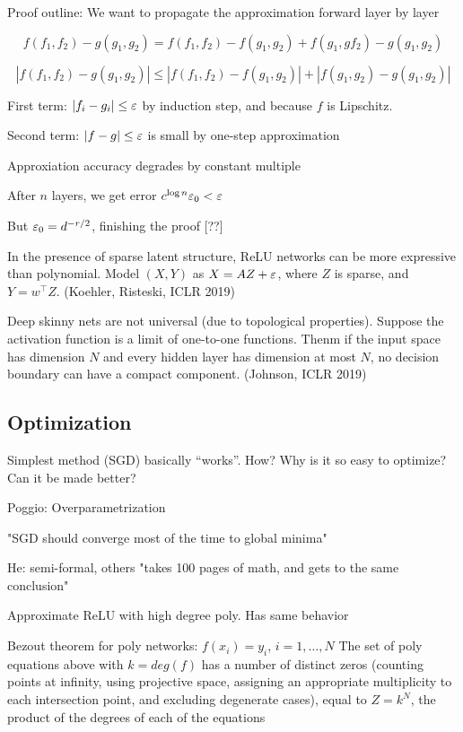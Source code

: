 \documentclass[english]{article}
\begin{document}
Proof outline: We want to propagate the approximation forward layer by layer

$$f(f_1,f_2)-g(g_1,g_2) = f(f_1,f_2)-f(g_1,g_2)+f(g_1,gf_2)-g(g_1,g_2)$$

$$|f(f_1,f_2)-g(g_1,g_2)| \le| f(f_1,f_2)-f(g_1,g_2)|+|f(g_1,g_2)-g(g_1,g_2)|$$


First term: $|f_i-g_i| \le \varepsilon$ by induction step, and because $f$ is Lipschitz.

Second term: $|f-g| \le \varepsilon$ is small by one-step approximation

Approxiation accuracy degrades by constant multiple 

After $n$ layers, we get error $c^{\log n } \varepsilon_0 <\varepsilon$

But $\varepsilon_0 = d^{-r/2}$, finishing the proof [??]

\item In the presence of sparse latent structure, ReLU networks can be more expressive than polynomial. Model $(X,Y)$ as $X=AZ+\varepsilon$, where $Z$ is sparse, and $Y = w^\top Z$. (Koehler, Risteski, ICLR 2019)

\item Deep skinny nets are not universal (due to topological properties). Suppose the activation function is a limit of one-to-one functions. Thenm if the input space has dimension $N$ and every hidden layer has dimension at most $N$, no decision boundary can have a compact component. (Johnson, ICLR 2019)

\eenum

\subsection{Optimization}


\benum
\item 
Simplest method (SGD) basically ``works''. How? Why is it so easy to optimize? Can it be made better? 

\item Poggio: Overparametrization

\benum

\item "SGD should converge most of the time to global minima"

He: semi-formal, others "takes 100 pages of math, and gets to the same conclusion"

\item Approximate ReLU with high degree poly. Has same behavior

\item Bezout theorem for poly networks:  $f(x_i)=y_i$, $i=1,\ldots,N$  The set of poly equations above with $k=deg(f)$ has a number of distinct zeros (counting points at infinity, using projective space, assigning an appropriate multiplicity to each intersection point, and excluding degenerate cases), equal to $Z=k^N$, the product of the degrees of each of the equations
\end{document}
